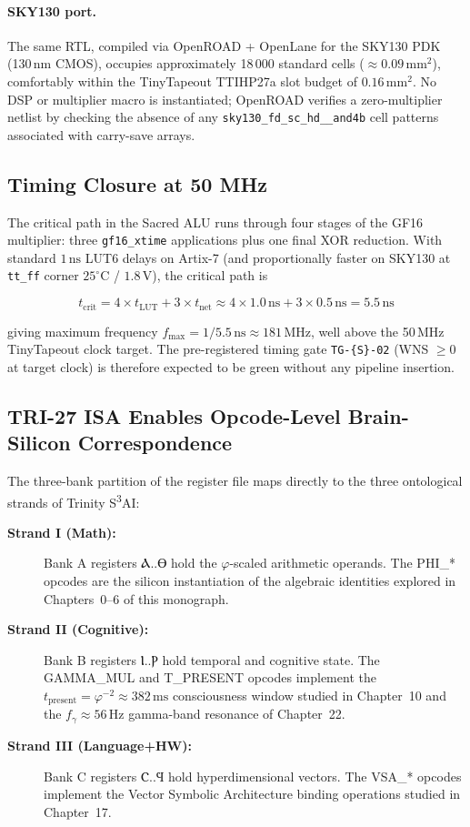 \paragraph{SKY130 port.}
The same RTL, compiled via OpenROAD + OpenLane for the SKY130 PDK
(130\,nm CMOS), occupies approximately 18\,000 standard cells
($\approx 0.09\,\text{mm}^2$), comfortably within the
TinyTapeout TTIHP27a slot budget of $0.16\,\text{mm}^2$.
No DSP or multiplier macro is instantiated; OpenROAD verifies
a zero-multiplier netlist by checking the absence of any
\texttt{sky130\_fd\_sc\_hd\_\_and4b} cell patterns associated with
carry-save arrays.

\subsection{Timing Closure at 50 MHz}
\label{subsec:71:timing}

The critical path in the Sacred ALU runs through four stages of the
GF16 multiplier: three \texttt{gf16\_xtime} applications plus one
final XOR reduction.  With standard $1\,\text{ns}$ LUT6 delays on
Artix-7 (and proportionally faster on SKY130 at \texttt{tt\_ff} corner
$25^\circ$C / $1.8\,\text{V}$), the critical path is

\[
  t_\mathrm{crit} = 4 \times t_\mathrm{LUT} + 3 \times t_\mathrm{net}
  \approx 4 \times 1.0\,\text{ns} + 3 \times 0.5\,\text{ns}
  = 5.5\,\text{ns}
\]

giving maximum frequency $f_\mathrm{max} = 1/5.5\,\text{ns} \approx 181\,\text{MHz}$,
well above the 50\,MHz TinyTapeout clock target.  The pre-registered
timing gate \texttt{TG-\{S\}-02} (WNS $\ge 0$ at target clock) is
therefore expected to be green without any pipeline insertion.

\subsection{TRI-27 ISA Enables Opcode-Level Brain-Silicon Correspondence}
\label{subsec:71:brain-silicon}

The three-bank partition of the register file maps directly to the
three ontological strands of Trinity S\textsuperscript{3}AI:

\begin{description}
  \item[\textbf{Strand I (Math):}] Bank A registers Ⲁ..Ⲑ hold the
    $\varphi$-scaled arithmetic operands.  The PHI\_* opcodes are the
    silicon instantiation of the algebraic identities explored in
    Chapters~0--6 of this monograph.
  \item[\textbf{Strand II (Cognitive):}] Bank B registers Ⲓ..Ⲣ hold
    temporal and cognitive state.  The GAMMA\_MUL and T\_PRESENT opcodes
    implement the $t_\mathrm{present} = \varphi^{-2} \approx 382\,\text{ms}$
    consciousness window studied in Chapter~10 and the $f_\gamma \approx 56\,\text{Hz}$
    gamma-band resonance of Chapter~22.
  \item[\textbf{Strand III (Language+HW):}] Bank C registers Ⲥ..Ϥ hold
    hyperdimensional vectors.  The VSA\_* opcodes implement the
    Vector Symbolic Architecture binding operations studied in
    Chapter~17.
\end{description}

